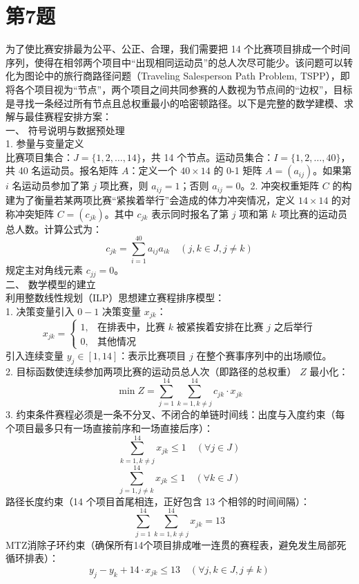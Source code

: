 \documentclass[UTF8]{article}
\begin{document}
\section*{第7题}

为了使比赛安排最为公平、公正、合理，我们需要把 14 个比赛项目排成一个时间序列，使得在相邻两个项目中“出现相同运动员”的总人次尽可能少。该问题可以转化为图论中的旅行商路径问题（Traveling Salesperson Path Problem, TSPP），即将各个项目视为“节点”，两个项目之间共同参赛的人数视为节点间的“边权”，目标是寻找一条经过所有节点且总权重最小的哈密顿路径。以下是完整的数学建模、求解与最佳赛程安排方案：\\
一、 符号说明与数据预处理\\
1. 参量与变量定义\\
比赛项目集合：$J = \{1, 2, \dots, 14\}$，共 14 个节点。运动员集合：$I = \{1, 2, \dots, 40\}$，共 40 名运动员。报名矩阵 $A$：定义一个 $40 \times 14$ 的 0-1 矩阵 $A = (a_{ij})$。如果第 $i$ 名运动员参加了第 $j$ 项比赛，则 $a_{ij} = 1$；否则 $a_{ij} = 0$。2. 冲突权重矩阵 $C$ 的构建为了衡量若某两项比赛“紧挨着举行”会造成的体力冲突情况，定义 $14 \times 14$ 的对称冲突矩阵 $C = (c_{jk})$。其中 $c_{jk}$ 表示同时报名了第 $j$ 项和第 $k$ 项比赛的运动员总人数。计算公式为：$$c_{jk} = \sum_{i=1}^{40} a_{ij} a_{ik} \quad (j, k \in J, j \neq k)$$规定主对角线元素 $c_{jj} = 0$。\\
二、 数学模型的建立\\
利用整数线性规划（ILP）思想建立赛程排序模型：\\
1. 决策变量引入 $0-1$ 决策变量 $x_{jk}$：$$ x_{jk} = \begin{cases} 1, & \text{在排表中，比赛 } k \text{ 被紧挨着安排在比赛 } j \text{ 之后举行} \\ 0, & \text{其他情况} \end{cases} $$
引入连续变量 $y_j \in [1, 14]$：表示比赛项目 $j$ 在整个赛事序列中的出场顺位。\\
2. 目标函数使连续参加两项比赛的运动员总人次（即路径的总权重） $Z$ 最小化：
$$ \min Z = \sum_{j=1}^{14} \sum_{k=1, k\neq j}^{14} c_{jk} \cdot x_{jk} $$
3. 约束条件赛程必须是一条不分叉、不闭合的单链时间线：出度与入度约束（每个项目最多只有一场直接前序和一场直接后序）：
$$ \sum_{k=1, k \neq j}^{14} x_{jk} \le 1 \quad (\forall j \in J) $$
$$ \sum_{j=1, j \neq k}^{14} x_{jk} \le 1 \quad (\forall k \in J) $$
路径长度约束（14 个项目首尾相连，正好包含 13 个相邻的时间间隔）：
$$ \sum_{j=1}^{14} \sum_{k=1, k \neq j}^{14} x_{jk} = 13 $$
MTZ消除子环约束（确保所有14个项目排成唯一连贯的赛程表，避免发生局部死循环排表）：$$ y_j - y_k + 14 \cdot x_{jk} \le 13 \quad (\forall j, k \in J, j \neq k) $$
\end{document}
